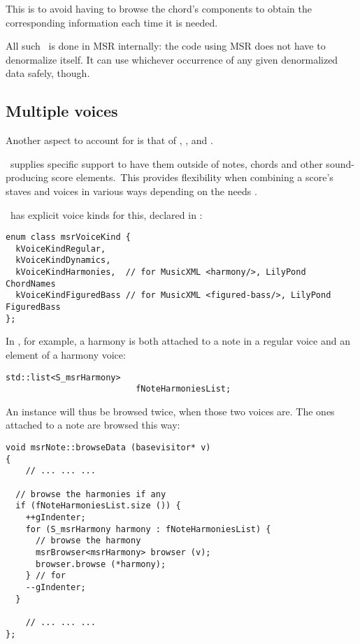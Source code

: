This is to avoid having to browse the chord's components to obtain the corresponding information each time it is needed.

All such \denorm\ is done in MSR internally: the code using MSR does not have to denormalize itself.
It can use whichever occurrence of any given denormalized data safely, though.


\subsection{Multiple voices}

Another aspect to account for is that of , ,  and . 

\lily\ supplies specific support to have them outside of notes, chords and other sound-producing score elements.\
This provides flexibility when combining a score's staves and voices in various ways depending on the needs .

\mf\ has explicit voice kinds for this, declared in :
\begin{lstlisting}[language=CPlusPlus]
enum class msrVoiceKind {
  kVoiceKindRegular,
  kVoiceKindDynamics,
  kVoiceKindHarmonies,  // for MusicXML <harmony/>, LilyPond ChordNames
  kVoiceKindFiguredBass // for MusicXML <figured-bass/>, LilyPond FiguredBass
};
\end{lstlisting}

In \msrRepr, for example, a harmony is both attached to a note in a regular voice and an element of a harmony voice:
\begin{lstlisting}[language=CPlusPlus]
    std::list<S_msrHarmony>
                          fNoteHarmoniesList;
\end{lstlisting}

An  instance will thus be browsed twice, when those two voices are. The ones attached to a note are browsed this way:
\begin{lstlisting}[language=CPlusPlus]
void msrNote::browseData (basevisitor* v)
{
	// ... ... ...
	
  // browse the harmonies if any
  if (fNoteHarmoniesList.size ()) {
    ++gIndenter;
    for (S_msrHarmony harmony : fNoteHarmoniesList) {
      // browse the harmony
      msrBrowser<msrHarmony> browser (v);
      browser.browse (*harmony);
    } // for
    --gIndenter;
  }
	
	// ... ... ...
};
\end{lstlisting}


